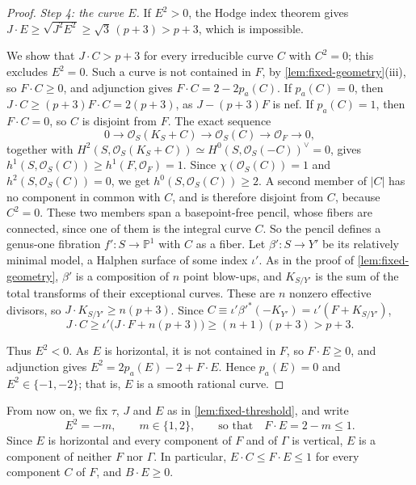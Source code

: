 \documentclass[11pt,reqno]{amsart}
\numberwithin{equation}{section}
\theoremstyle{remark}
\newcommand{\sshf}[1]{\mathcal{O}_{#1}}
\newcommand{\prj}[1]{\mathbb{P}^{#1}}
\newcommand{\pa}{p_a}
\begin{document}
\begin{proof}
\smallskip\noindent\emph{Step 4: the curve \(E\).} If \(E^2>0\), the Hodge index theorem gives \(J\cdot E\geq\sqrt{J^2E^2}\geq\sqrt3\,(p+3)>p+3\), which is impossible.

We show that \(J\cdot C>p+3\) for every irreducible curve \(C\) with \(C^2=0\); this excludes \(E^2=0\). Such a curve is not contained in \(F\), by \cref{lem:fixed-geometry}\textup{(iii)}, so \(F\cdot C\geq0\), and adjunction gives \(F\cdot C=2-2\pa(C)\). If \(\pa(C)=0\), then \(J\cdot C\geq(p+3)F\cdot C=2(p+3)\), as \(J-(p+3)F\) is nef. If \(\pa(C)=1\), then \(F\cdot C=0\), so \(C\) is disjoint from \(F\). The exact sequence
\[
 0\longrightarrow\sshf{S}(K_S+C)\longrightarrow\sshf{S}(C)\longrightarrow\sshf{F}\longrightarrow0,
\]
together with \(H^2(S,\sshf{S}(K_S+C))\simeq H^0(S,\sshf{S}(-C))^\vee=0\), gives \(h^1(S,\sshf{S}(C))\geq h^1(F,\sshf{F})=1\). Since \(\chi(\sshf{S}(C))=1\) and \(h^2(S,\sshf{S}(C))=0\), we get \(h^0(S,\sshf{S}(C))\geq2\). A second member of \(|C|\) has no component in common with \(C\), and is therefore disjoint from \(C\), because \(C^2=0\). These two members span a basepoint-free pencil, whose fibers are connected, since one of them is the integral curve \(C\). So the pencil defines a genus-one fibration \(f'\colon S\to\prj{1}\) with \(C\) as a fiber. Let \(\beta'\colon S\to Y'\) be its relatively minimal model, a Halphen surface of some index \(\iota'\). As in the proof of \cref{lem:fixed-geometry}, \(\beta'\) is a composition of \(n\) point blow-ups, and \(K_{S/Y'}\) is the sum of the total transforms of their exceptional curves. These are \(n\) nonzero effective divisors, so \(J\cdot K_{S/Y'}\geq n(p+3)\). Since \(C\equiv\iota'\beta'^*(-K_{Y'})=\iota'(F+K_{S/Y'})\),
\[
 J\cdot C\geq\iota'\bigl(J\cdot F+n(p+3)\bigr)\geq(n+1)(p+3)>p+3.
\]

Thus \(E^2<0\). As \(E\) is horizontal, it is not contained in \(F\), so \(F\cdot E\geq0\), and adjunction gives \(E^2=2\pa(E)-2+F\cdot E\). Hence \(\pa(E)=0\) and \(E^2\in\{-1,-2\}\); that is, \(E\) is a smooth rational curve.
\end{proof}

From now on, we fix \(\tau\), \(J\) and \(E\) as in \cref{lem:fixed-threshold}, and write
\[
 E^2=-m,\qquad m\in\{1,2\},\qquad\text{so that}\quad F\cdot E=2-m\leq1.
\]
Since \(E\) is horizontal and every component of \(F\) and of \(\Gamma\) is vertical, \(E\) is a component of neither \(F\) nor \(\Gamma\). In particular, \(E\cdot C\leq F\cdot E\leq1\) for every component \(C\) of \(F\), and \(B\cdot E\geq0\).
\end{document}
